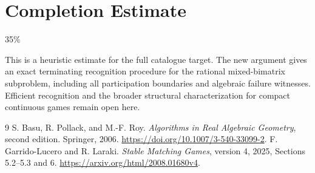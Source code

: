 \documentclass[11pt]{article}
\theoremstyle{definition}
\theoremstyle{remark}
\begin{document}
\section{Completion Estimate}
35\%

This is a heuristic estimate for the full catalogue target.
The new argument gives an exact terminating recognition procedure for the
rational mixed-bimatrix subproblem, including all participation boundaries
and algebraic failure witnesses. Efficient recognition and the broader
structural characterization for compact continuous games remain open here.

\begin{thebibliography}{9}
 S. Basu, R. Pollack, and M.-F. Roy.
\emph{Algorithms in Real Algebraic Geometry}, second edition. Springer,
2006. \url{https://doi.org/10.1007/3-540-33099-2}.
 F. Garrido-Lucero and R. Laraki.
\emph{Stable Matching Games}, version 4, 2025, Sections 5.2--5.3 and 6.
\url{https://arxiv.org/html/2008.01680v4}.
\end{thebibliography}
\end{document}
